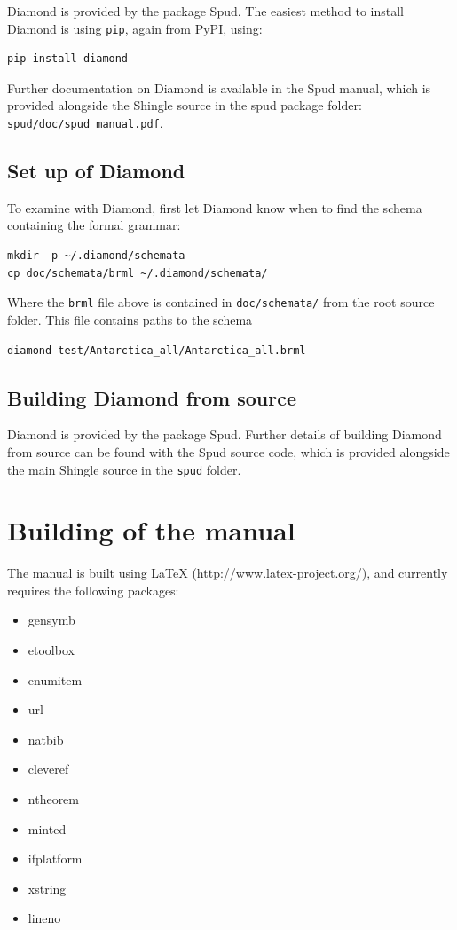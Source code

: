\documentclass[a4paper, 10pt]{book}
\providecommand{\shingle}{Shingle\xspace}
\begin{document}
\noindent
Diamond is provided by the package Spud.
The easiest method to install Diamond is using \verb+pip+, again from PyPI, using:
\begin{verbatim}
pip install diamond 
\end{verbatim}
Further documentation on Diamond is available in the Spud manual,
which is provided alongside the \shingle source in the spud package folder: \verb+spud/doc/spud_manual.pdf+.

\subsection{Set up of Diamond}

\noindent
To examine with Diamond, first let Diamond know when to find the schema containing the formal grammar:
\begin{verbatim}
mkdir -p ~/.diamond/schemata
cp doc/schemata/brml ~/.diamond/schemata/ 
\end{verbatim}

\noindent
Where the \verb+brml+ file above is contained in \verb+doc/schemata/+ from the root source folder.  This file contains paths to the schema
\begin{verbatim}
diamond test/Antarctica_all/Antarctica_all.brml
\end{verbatim}

\subsection{Building Diamond from source}

\noindent
Diamond is provided by the package Spud.
Further details of building Diamond from source can be found with the Spud source code,
which is provided alongside the main \shingle source in the \verb+spud+ folder.



\section{Building of the manual}

\noindent
The manual is built using LaTeX (\url{http://www.latex-project.org/}), and currently requires the following packages:
\begin{itemize}
\item gensymb
\item etoolbox
\item enumitem
\item url
\item natbib
\item cleveref
\item ntheorem
\item minted
\item ifplatform
\item xstring
\item lineno
\end{itemize}
\end{document}

